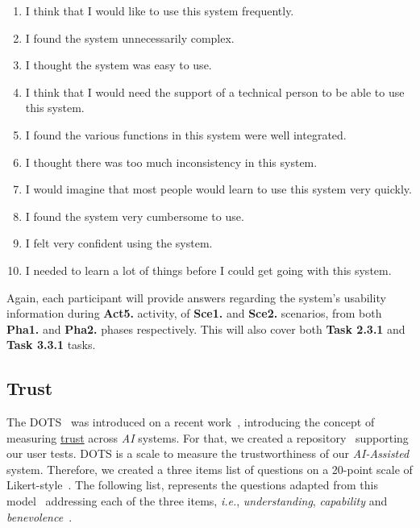 \begin{enumerate}
\item I think that I would like to use this system frequently.
\item I found the system unnecessarily complex.
\item I thought the system was easy to use.
\item I think that I would need the support of a technical person to be able to use this system.
\item I found the various functions in this system were well integrated.
\item I thought there was too much inconsistency in this system.
\item I would imagine that most people would learn to use this system very quickly.
\item I found the system very cumbersome to use.
\item I felt very confident using the system.
\item I needed to learn a lot of things before I could get going with this system.
\end{enumerate}

Again, each participant will provide answers regarding the system's usability information during {\bf Act5.} activity, of {\bf Sce1.} and {\bf Sce2.} scenarios, from both {\bf Pha1.} and {\bf Pha2.} phases respectively. This will also cover both {\bf Task 2.3.1} and {\bf Task 3.3.1} tasks.

\subsection{Trust}

The \gls{DOTS}~\cite{francisco_maria_calisto_2019_2671717, https://doi.org/10.13140/rg.2.2.23078.37448} was introduced on a recent work~\cite{Cai:2019:EEE:3301275.3302289, Cai:2019:HTC:3290605.3300234}, introducing the concept of measuring \underline{trust} across {\it AI} systems.
For that, we created a repository~\cite{francisco_maria_calisto_2019_2671717} supporting our user tests.
\gls{DOTS} is a scale to measure the trustworthiness of our {\it AI-Assisted} system.
Therefore, we created a three items list of questions on a 20-point scale of Likert-style~\cite{joshi2015likert}.
The following list, represents the questions adapted from this model~\cite{mayer1995integrative} addressing each of the three items, {\it i.e.}, {\it understanding}, {\it capability} and {\it benevolence}~\cite{Cai:2019:EEE:3301275.3302289}.

